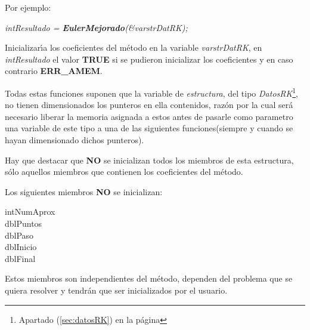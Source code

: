 Por ejemplo:

\begin{center}
\emph{intResultado = \textbf{EulerMejorado}(\&varstrDatRK);}
\end{center}


Inicializar\'{\i}a los coeficientes del m\'etodo en la variable
\emph{varstrDatRK}, en \emph{intResultado} el valor \textbf{TRUE} si se pudieron
inicializar los coeficientes y en caso contrario \textbf{ERR\_AMEM}.





Todas estas funciones suponen que la variable de \emph{estructura}, del tipo
\emph{DatosRK}\footnote{Apartado (\ref{sec:datosRK}) en la p\'agina 
\pageref{sec:datosRK}}, no tienen dimensionados los punteros en ella 
contenidos, raz\'on por la cual ser\'a necesario liberar la memoria asignada
a estos antes de pasarle como parametro una variable de este tipo a una de
las siguientes funciones(siempre y cuando se hayan dimensionado dichos
punteros).\newline

Hay que destacar que \textbf{NO} se inicializan todos los miembros de esta
estructura, s\'olo aquellos miembros que contienen los coeficientes del 
m\'etodo.\newline

Los siguientes miembros \textbf{NO} se inicializan:
%
\begin{description}
\item[intNumAprox]
\item[dblPuntos]
\item[dblPaso]
\item[dblInicio]
\item[dblFinal]
\end{description}

Estos miembros son independientes del m\'etodo, dependen del problema que
se quiera resolver y tendr\'an que ser inicializados por el usuario.
